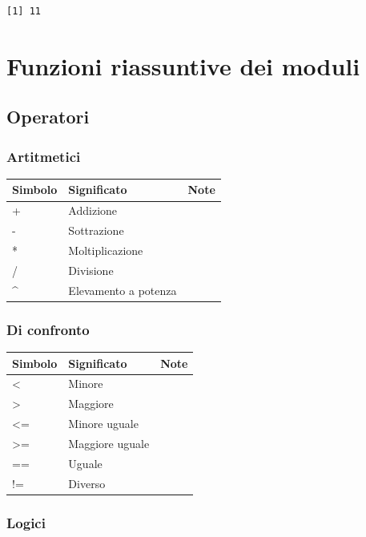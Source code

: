 \documentclass[
  a4paper,
  DIV=11,
  numbers=noendperiod]{scrreprt}
\begin{document}
\begin{verbatim}
[1] 11
\end{verbatim}

\chapter{Funzioni riassuntive dei
moduli}\label{funzioni-riassuntive-dei-moduli}

\section{Operatori}\label{operatori-1}

\subsection{Artitmetici}\label{artitmetici}

\begin{longtable}[]{@{}lll@{}}
\toprule\noalign{}
Simbolo & Significato & Note \\
\midrule\noalign{}
\endhead
\bottomrule\noalign{}
\endlastfoot
+ & Addizione & \\
- & Sottrazione & \\
* & Moltiplicazione & \\
/ & Divisione & \\
\^{} & Elevamento a potenza & \\
\end{longtable}

\subsection{Di confronto}\label{di-confronto}

\begin{longtable}[]{@{}lll@{}}
\toprule\noalign{}
Simbolo & Significato & Note \\
\midrule\noalign{}
\endhead
\bottomrule\noalign{}
\endlastfoot
\textless{} & Minore & \\
\textgreater{} & Maggiore & \\
\textless= & Minore uguale & \\
\textgreater= & Maggiore uguale & \\
== & Uguale & \\
!= & Diverso & \\
\end{longtable}

\subsection{Logici}\label{logici}
\end{document}
